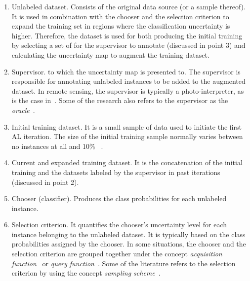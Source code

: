 \documentclass[remotesensing,article,submit,moreauthors,pdftex]{Definitions/mdpi}
\begin{document}
\begin{enumerate}
    \item Unlabeled dataset. Consists of the original data source (or a sample
        thereof). It is used in combination with the chooser and the selection
        criterion to expand the training set in regions where the
        classification uncertainty is higher. Therefore, the 
        dataset is used for both producing the initial training
         by selecting a set of  for the
        supervisor to annotate (discussed in point 3) and calculating the
        uncertainty map to augment the training dataset.
    \item Supervisor.  to which the uncertainty map is
        presented to. The supervisor is responsible for annotating unlabeled
        instances to be added to the augmented dataset. In remote sensing, the
        supervisor is typically a photo-interpreter, as is the case
        in~\cite{li2020}. Some of the research also refers to the supervisor
        as the \textit{oracle}~\cite{Ruzicka2020, Yoo2019, Aghdam2019,
        Cawley2011}.
    \item Initial training dataset. It is a small sample of
         data  used to initiate the first AL
        iteration. The size of the initial training sample normally varies
        between no instances at all and 10\% ~\cite{Li2013}.
    \item Current and expanded training dataset. It is the concatenation of
        the initial training  and the datasets labeled by the
        supervisor in past iterations (discussed in point 2).
    \item Chooser (classifier). Produces the class probabilities for each
        unlabeled instance.
    \item Selection criterion. It quantifies the chooser's uncertainty level
        for each instance belonging to the unlabeled dataset. It is typically
        based on the class probabilities assigned by the chooser. In some
        situations, the chooser and the selection criterion are grouped
        together under the concept \textit{acquisition
        function}~\cite{Ruzicka2020} or \textit{query function}~\cite{Su2020}.
        Some of the literature refers to the selection criterion by using the
        concept \textit{sampling scheme}~\cite{Liu2020}.
\end{enumerate}
\end{document}
